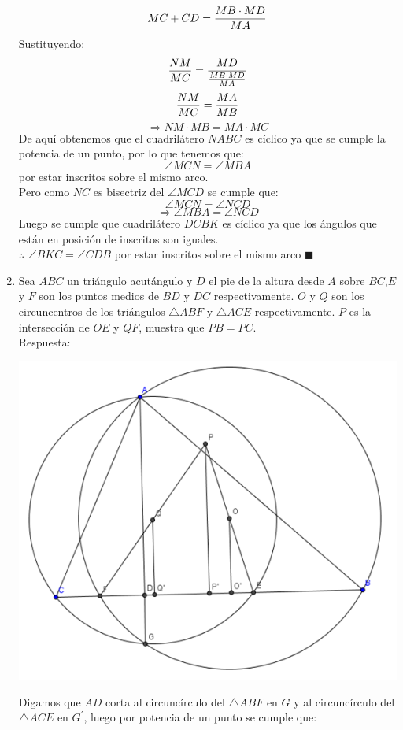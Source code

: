\documentclass{book}
\begin{document}
\begin{enumerate}
$$MC+CD={ MB\cdot MD\over MA}$$
Sustituyendo:
$${NM\over MC}=\frac{MD}{{MB\cdot MD\over MA}}$$
$${NM\over MC}={MA\over MB}$$
$$\Rightarrow NM\cdot MB=MA\cdot MC$$
De aquí obtenemos que el cuadrilátero $NABC$ es cíclico ya que se cumple la potencia de un punto, por lo que tenemos que:
$$\angle MCN=\angle MBA$$
por estar inscritos sobre el mismo arco.\\
Pero como $NC$ es bisectriz del $\angle MCD$ se cumple que:
$$\angle MCN=\angle NCD$$
$$\Rightarrow \angle MBA=\angle NCD$$
Luego se cumple que cuadrilátero $DCBK$ es cíclico ya que los ángulos que están en posición de inscritos son iguales.\\
$\therefore$ $\angle BKC=\angle CDB$ por estar inscritos sobre el mismo arco $\blacksquare$\\
				\item Sea $ABC$ un triángulo acutángulo y $D$ el pie de la altura desde $A$ sobre $BC$,$E$ y $F$ son los puntos medios de $BD$ y $DC$ respectivamente. $O$ y $Q$ son los circuncentros de los triángulos $\triangle ABF$ y $\triangle ACE$ respectivamente. $P$ es la intersección de $OE$ y $QF$, muestra que $PB=PC$. \\
					Respuesta:
					\begin{center}
						\includegraphics[scale=1]{imagenes/Geometria/12.png}
					\end{center}
					Digamos que $AD$ corta al circuncírculo del $\triangle ABF$ en $G$ y al circuncírculo del $\triangle ACE$ en $G^{'}$, luego por potencia de un punto se cumple que:

\end{enumerate}
\end{document}
